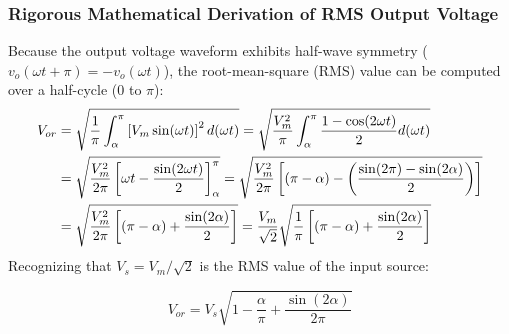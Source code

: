 \documentclass[11pt,a4paper]{article}
\begin{document}
\subsubsection{Rigorous Mathematical Derivation of RMS Output Voltage}
Because the output voltage waveform exhibits half-wave symmetry ($v_o(\omega t + \pi) = -v_o(\omega t)$), the root-mean-square (RMS) value can be computed over a half-cycle ($0$ to $\pi$):
\begin{align}
V_{or} &= \sqrt{\frac{1}{\pi} \int_{\alpha}^{\pi} \left[V_m \sin(\omega t)\right]^2 d(\omega t)} = \sqrt{\frac{V_m^2}{\pi} \int_{\alpha}^{\pi} \frac{1 - \cos(2\omega t)}{2} d(\omega t)} \notag\\
&= \sqrt{\frac{V_m^2}{2\pi} \left[ \omega t - \frac{\sin(2\omega t)}{2} \right]_{\alpha}^{\pi}} = \sqrt{\frac{V_m^2}{2\pi} \left[ (\pi - \alpha) - \left(\frac{\sin(2\pi) - \sin(2\alpha)}{2}\right) \right]} \notag\\
&= \sqrt{\frac{V_m^2}{2\pi} \left[ (\pi - \alpha) + \frac{\sin(2\alpha)}{2} \right]} = \frac{V_m}{\sqrt{2}} \sqrt{\frac{1}{\pi} \left[ (\pi - \alpha) + \frac{\sin(2\alpha)}{2} \right]}
\end{align}
Recognizing that $V_s = V_m / \sqrt{2}$ is the RMS value of the input source:
\begin{formulabox}
\begin{equation}
V_{or} = V_s \sqrt{1 - \frac{\alpha}{\pi} + \frac{\sin(2\alpha)}{2\pi}}
\label{eq:acvc_rms_r}
\end{equation}
\end{formulabox}
\end{document}
